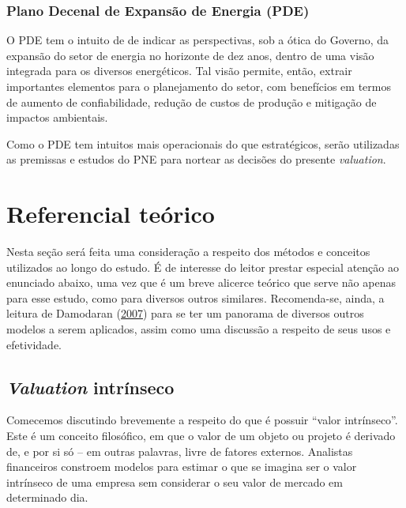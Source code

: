 \documentclass[aprovado,numbers]{coppe}
\begin{document}
  \hypertarget{plano-decenal-de-expansuxe3o-de-energia-pde}{%
  \subsection{Plano Decenal de Expansão de Energia (PDE)}\label{plano-decenal-de-expansuxe3o-de-energia-pde}}

  O PDE tem o intuito de de indicar as perspectivas, sob a ótica do Governo, da expansão do setor de energia no horizonte de dez anos, dentro de uma visão integrada para os diversos energéticos. Tal visão permite, então, extrair importantes elementos para o planejamento do setor, com benefícios em termos de aumento de confiabilidade, redução de custos de produção e mitigação de impactos ambientais.

  Como o PDE tem intuitos mais operacionais do que estratégicos, serão utilizadas as premissas e estudos do PNE para nortear as decisões do presente \emph{valuation}.

  \hypertarget{referencial-teuxf3rico}{%
  \chapter{Referencial teórico}\label{referencial-teuxf3rico}}

  Nesta seção será feita uma consideração a respeito dos métodos e conceitos utilizados ao longo do estudo. É de interesse do leitor prestar especial atenção ao enunciado abaixo, uma vez que é um breve alicerce teórico que serve não apenas para esse estudo, como para diversos outros similares. Recomenda-se, ainda, a leitura de Damodaran (\protect\hyperlink{ref-damodaran2007}{2007}) para se ter um panorama de diversos outros modelos a serem aplicados, assim como uma discussão a respeito de seus usos e efetividade.

  \hypertarget{valuation-intruxednseco}{%
  \section{\texorpdfstring{\emph{Valuation} intrínseco}{Valuation intrínseco}}\label{valuation-intruxednseco}}

  Comecemos discutindo brevemente a respeito do que é possuir ``valor intrínseco''. Este é um conceito filosófico, em que o valor de um objeto ou projeto é derivado de, e por si só -- em outras palavras, livre de fatores externos. Analistas financeiros constroem modelos para estimar o que se imagina ser o valor intrínseco de uma empresa sem considerar o seu valor de mercado em determinado dia.
\end{document}
